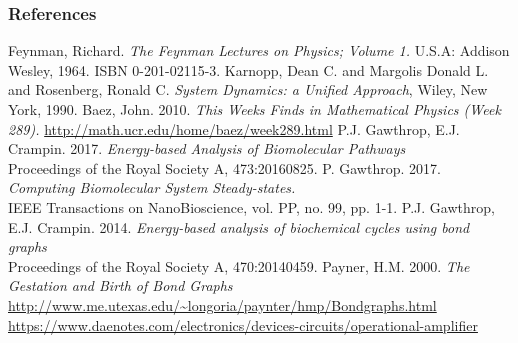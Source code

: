 \documentclass[12pt,reqno]{beamer}
\begin{document}
\begin{frame}
\frametitle{References}
{\tiny
	\begin{thebibliography}{6}
		 Feynman, Richard. \emph{The Feynman Lectures on Physics; Volume 1.} U.S.A: Addison Wesley, 1964. ISBN 0-201-02115-3.
		 Karnopp, Dean C. and Margolis Donald L. and Rosenberg, Ronald C. \emph{System Dynamics: a Unified Approach}, Wiley, New York, 1990.
		 Baez, John. 2010. \emph{This Weeks Finds in Mathematical Physics (Week 289).} \url{http://math.ucr.edu/home/baez/week289.html}
		  P.J. Gawthrop, E.J. Crampin. 2017. \emph{Energy-based Analysis of Biomolecular Pathways}\\
		Proceedings of the Royal Society A, 473:20160825.
		 P. Gawthrop. 2017. \emph{Computing Biomolecular System Steady-states.}\\
		IEEE Transactions on NanoBioscience, vol. PP, no. 99, pp. 1-1. 
		 P.J. Gawthrop, E.J. Crampin. 2014. \emph{Energy-based analysis of biochemical cycles using bond graphs}\\
		Proceedings of the Royal Society A, 470:20140459.
		 Payner, H.M. 2000. \emph{The Gestation and Birth of Bond Graphs} \url{http://www.me.utexas.edu/\~longoria/paynter/hmp/Bondgraphs.html}
		\url{https://www.daenotes.com/electronics/devices-circuits/operational-amplifier}
\end{thebibliography}}
\end{frame}
\end{document}
